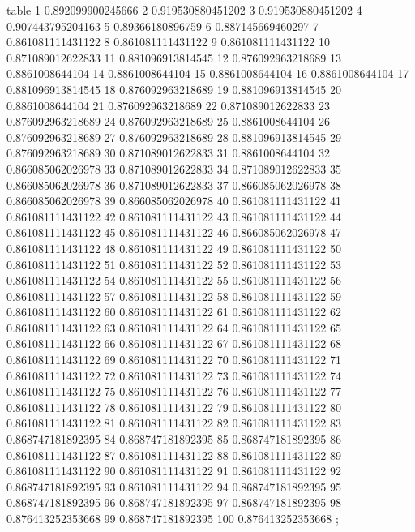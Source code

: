 table {%
	1 0.892099900245666
	2 0.919530880451202
	3 0.919530880451202
	4 0.907443795204163
	5 0.89366180896759
	6 0.887145669460297
	7 0.861081111431122
	8 0.861081111431122
	9 0.861081111431122
	10 0.871089012622833
	11 0.881096913814545
	12 0.876092963218689
	13 0.8861008644104
	14 0.8861008644104
	15 0.8861008644104
	16 0.8861008644104
	17 0.881096913814545
	18 0.876092963218689
	19 0.881096913814545
	20 0.8861008644104
	21 0.876092963218689
	22 0.871089012622833
	23 0.876092963218689
	24 0.876092963218689
	25 0.8861008644104
	26 0.876092963218689
	27 0.876092963218689
	28 0.881096913814545
	29 0.876092963218689
	30 0.871089012622833
	31 0.8861008644104
	32 0.866085062026978
	33 0.871089012622833
	34 0.871089012622833
	35 0.866085062026978
	36 0.871089012622833
	37 0.866085062026978
	38 0.866085062026978
	39 0.866085062026978
	40 0.861081111431122
	41 0.861081111431122
	42 0.861081111431122
	43 0.861081111431122
	44 0.861081111431122
	45 0.861081111431122
	46 0.866085062026978
	47 0.861081111431122
	48 0.861081111431122
	49 0.861081111431122
	50 0.861081111431122
	51 0.861081111431122
	52 0.861081111431122
	53 0.861081111431122
	54 0.861081111431122
	55 0.861081111431122
	56 0.861081111431122
	57 0.861081111431122
	58 0.861081111431122
	59 0.861081111431122
	60 0.861081111431122
	61 0.861081111431122
	62 0.861081111431122
	63 0.861081111431122
	64 0.861081111431122
	65 0.861081111431122
	66 0.861081111431122
	67 0.861081111431122
	68 0.861081111431122
	69 0.861081111431122
	70 0.861081111431122
	71 0.861081111431122
	72 0.861081111431122
	73 0.861081111431122
	74 0.861081111431122
	75 0.861081111431122
	76 0.861081111431122
	77 0.861081111431122
	78 0.861081111431122
	79 0.861081111431122
	80 0.861081111431122
	81 0.861081111431122
	82 0.861081111431122
	83 0.868747181892395
	84 0.868747181892395
	85 0.868747181892395
	86 0.861081111431122
	87 0.861081111431122
	88 0.861081111431122
	89 0.861081111431122
	90 0.861081111431122
	91 0.861081111431122
	92 0.868747181892395
	93 0.861081111431122
	94 0.868747181892395
	95 0.868747181892395
	96 0.868747181892395
	97 0.868747181892395
	98 0.876413252353668
	99 0.868747181892395
	100 0.876413252353668
};
